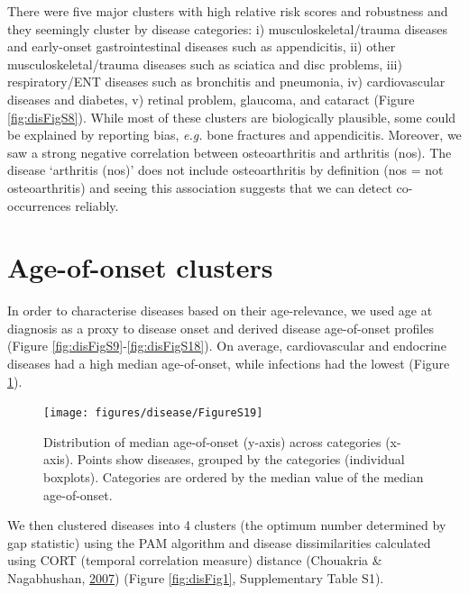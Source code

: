 \documentclass[12pt,twoside]{unicam}
\begin{document}
There were five major clusters with high relative risk scores and robustness and they seemingly cluster by disease categories: i) musculoskeletal/trauma diseases and early-onset gastrointestinal diseases such as appendicitis, ii) other musculoskeletal/trauma diseases such as sciatica and disc problems, iii) respiratory/ENT diseases such as bronchitis and pneumonia, iv) cardiovascular diseases and diabetes, v) retinal problem, glaucoma, and cataract (Figure \ref{fig:disFigS8}). While most of these clusters are biologically plausible, some could be explained by reporting bias, \emph{e.g.} bone fractures and appendicitis. Moreover, we saw a strong negative correlation between osteoarthritis and arthritis (nos). The disease `arthritis (nos)' does not include osteoarthritis by definition (nos = not osteoarthritis) and seeing this association suggests that we can detect co-occurrences reliably.

\hypertarget{age-of-onset-clusters}{%
\section{Age-of-onset clusters}\label{age-of-onset-clusters}}

In order to characterise diseases based on their age-relevance, we used age at diagnosis as a proxy to disease onset and derived disease age-of-onset profiles (Figure \ref{fig:disFigS9}-\ref{fig:disFigS18}). On average, cardiovascular and endocrine diseases had a high median age-of-onset, while infections had the lowest (Figure \ref{fig:disFigS19}).

\begin{figure}

{\centering \texttt{[image: figures/disease/FigureS19]} 

}

\caption[Distribution of median age-of-onset across categories.]{Distribution of median age-of-onset (y-axis) across categories (x-axis). Points show diseases, grouped by the categories (individual boxplots). Categories are ordered by the median value of the median age-of-onset.}\label{fig:disFigS19}
\end{figure}

We then clustered diseases into 4 clusters (the optimum number determined by gap statistic) using the PAM algorithm and disease dissimilarities calculated using CORT (temporal correlation measure) distance (Chouakria \& Nagabhushan, \protect\hyperlink{ref-Chouakria2007}{2007}) (Figure \ref{fig:disFig1}, Supplementary Table S1).
\end{document}
